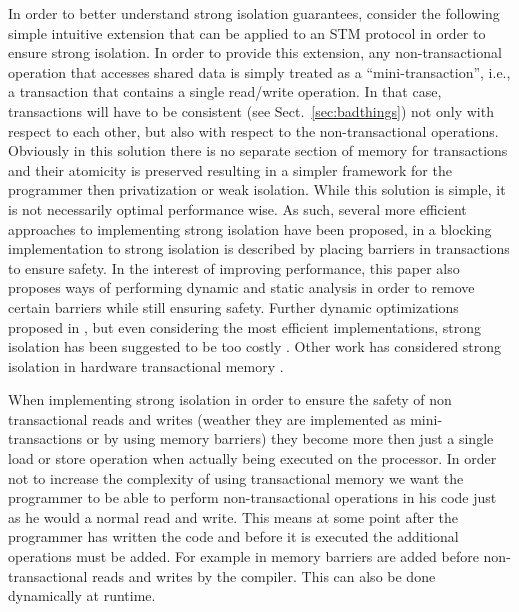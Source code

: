 In order to better understand strong isolation guarantees, consider
the following simple intuitive extension that can be applied to an STM protocol
in order to ensure strong isolation.
In order to provide this extension, any non-transactional operation that 
accesses shared data is simply treated as a ``mini-transaction'', i.e., a transaction  that contains a
single read/write operation. In that case,  transactions  will have to  be  
consistent (see Sect.~\ref{sec:badthings})  not only with 
respect to each other, but 
also with respect to the  non-transactional operations.
Obviously in this solution there is no separate section of memory for transactions
and their atomicity is preserved resulting in a simpler framework for
the programmer then privatization or weak isolation.
While this solution is simple, it is not necessarily optimal performance wise.
As such, several more efficient approaches to implementing strong isolation have been proposed,
in \cite{shpeis07} a blocking implementation to strong isolation
is described by placing barriers in transactions to ensure safety.
In the interest of improving performance, this paper also proposes ways of performing dynamic
and static analysis in order to remove certain barriers
while still ensuring safety.
Further dynamic optimizations proposed in \cite{SMSA08}, but
even considering the most efficient implementations, strong isolation has been suggested to be too costly \cite{DS09}.
Other work has considered strong isolation in hardware transactional memory \cite{MTCM07}.

When implementing strong isolation in order to ensure the safety of non transactional reads and writes
(weather they are implemented as mini-transactions or by using memory barriers)
they become more then just a single load or store operation when actually being executed on the processor.
In order not to increase the complexity of using transactional memory we want the programmer to be
able to perform non-transactional operations in his code just as he would a normal read and write.
This means at some point after the programmer has written the code and before it is executed
the additional operations must be added.
For example in \cite{shpeis07,SMSA08} memory barriers are added before non-transactional reads and writes
by the compiler.
This can also be done dynamically at runtime.

